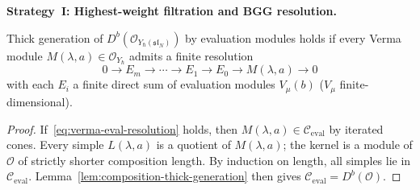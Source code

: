 \medskip

\noindent\textbf{Strategy~I\@: Highest-weight filtration and BGG
resolution.}

\begin{proposition}
\label{prop:bgg-criterion}
Thick generation of
$D^b(\mathcal{O}_{Y_\hbar(\mathfrak{sl}_N)})$ by evaluation
modules holds if every Verma module
$M(\lambda, a) \in \mathcal{O}_{Y_\hbar}$ admits a finite
resolution
\begin{equation}\label{eq:verma-eval-resolution}
0 \to E_m \to \cdots \to E_1 \to E_0 \to M(\lambda, a) \to 0
\end{equation}
with each $E_i$ a finite direct sum of evaluation modules
$V_\mu(b)$ \textup{(}$V_\mu$ finite-dimensional\textup{)}.
\end{proposition}

\begin{proof}
If~\eqref{eq:verma-eval-resolution} holds, then
$M(\lambda, a) \in \mathcal{C}_{\mathrm{eval}}$ by iterated cones.
Every simple $L(\lambda, a)$ is a quotient of $M(\lambda, a)$;
the kernel is a module of $\mathcal{O}$ of strictly shorter
composition length. By induction on length, all simples lie in
$\mathcal{C}_{\mathrm{eval}}$.
Lemma~\ref{lem:composition-thick-generation} then gives
$\mathcal{C}_{\mathrm{eval}} = D^b(\mathcal{O})$.
\end{proof}

